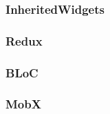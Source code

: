 \subsubsection{InheritedWidgets}  \label{par:todo_app_inherited_widget_introduction}

\subsubsection{Redux}  \label{par:todo_app_inherited_widget_introduction}

\subsubsection{BLoC}  \label{par:todo_app_inherited_widget_introduction}

\subsubsection{MobX}  \label{par:todo_app_inherited_widget_introduction}

